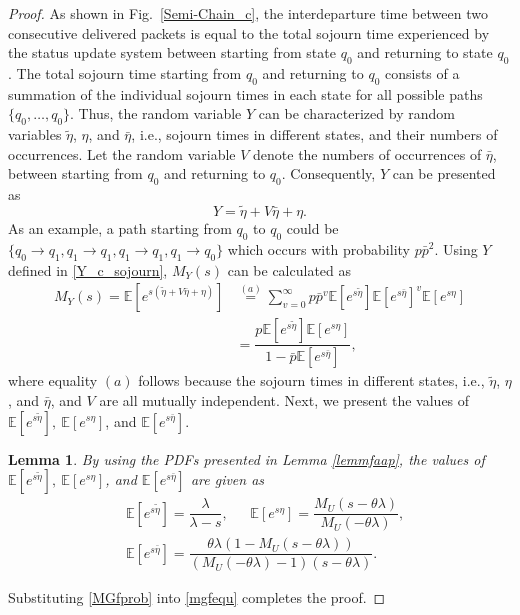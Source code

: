 \documentclass[conference]{IEEEtran}
\newtheorem{lemm}{Lemma}
\begin{document}
\begin{proof}
As shown in Fig.~\ref{Semi-Chain_c}, the interdeparture time between two consecutive delivered packets is equal to {the total sojourn time} experienced by the status update system between starting from state $q_0$ and returning to state $q_0$. 
%
The total sojourn time starting from $q_0$ and returning to $q_0$ consists of a summation of the individual sojourn times in each state for all possible paths $\{q_0,\ldots,q_0\}$. 
%
Thus, the random variable $Y$ can be characterized by random variables $\tilde\eta$, $\eta$, and $\bar\eta$, i.e., sojourn times in different states, and their numbers of occurrences.    
Let the random variable $V$
denote the numbers of occurrences of $\bar\eta$, between starting from $q_0$ and returning to $q_0$. Consequently, $Y$ can be presented as 
\begin{equation}\label{Y_c_sojourn}
Y=\tilde\eta+V\bar\eta+\eta.
\end{equation} 
As an example, a path starting from $q_0$ to $q_0$ could be $\{q_0\rightarrow q_1,q_1\rightarrow q_1,q_1\rightarrow q_1,q_1\rightarrow q_0\}$ which occurs with probability $p\bar{p}^2$.
Using $Y$ defined in \eqref{Y_c_sojourn}, 
 ${M}_{Y}(s)$ can be calculated as 
\begin{align}\nonumber
{M}_{Y}(s)=\mathbb{E}[e^{s(\tilde\eta+V\bar\eta+\eta)}]
&\stackrel{(a)}{=}\sum_{v=0}^{\infty}p\bar{p}^v\mathbb{E}[e^{s\tilde\eta}]\mathbb{E}[e^{s\bar\eta}]^v\mathbb{E}[e^{s\eta}]
\\&\label{mgfequ}
=\dfrac{{p}\mathbb{E}[e^{s\tilde\eta}]\mathbb{E}[e^{s\eta}]}{1-\bar{p}\mathbb{E}[e^{s\bar\eta}]},
\end{align}
where equality $ (a) $ follows because the sojourn times in different states, i.e., $\tilde\eta$, $ \eta$, and $\bar\eta$, and $V$ are all mutually independent.
Next, we present the 
values of 
$\mathbb{E}[e^{s\tilde\eta}],~\mathbb{E}[e^{s\eta}]$, and $\mathbb{E}[e^{s\bar\eta}]$.

\begin{lemm}\label{rem01}
By using the PDFs presented in  Lemma \ref{lemmfaap}, the values of $\mathbb{E}[e^{s\tilde\eta}],~\mathbb{E}[e^{s\eta}]$, and $\mathbb{E}[e^{s\bar\eta}]$ are given as
\begin{align}\nonumber
&\mathbb{E}[e^{s\tilde\eta}]=\dfrac{\lambda}{\lambda-s},~~~~~~~
\mathbb{E}[e^{s\eta}]=\dfrac{M_U(s-\theta\lambda)}{M_{U}(-\theta\lambda)},\\&\label{MGfprob}
\mathbb{E}[e^{s\bar\eta}]=\dfrac{\theta\lambda(1-M_U(s-\theta\lambda))}{(M_{U}(-\theta\lambda)-1)(s-\theta\lambda)}.
\end{align}
\end{lemm}

Substituting \eqref{MGfprob} into \eqref{mgfequ} completes
the proof.
\end{proof}
\end{document}
